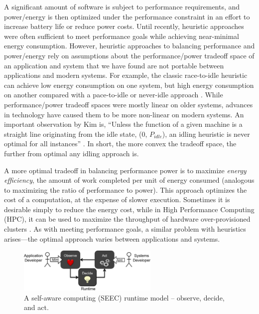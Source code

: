 A significant amount of software is subject to performance requirements, and power/energy is then optimized under the performance constraint in an effort to increase battery life or reduce power costs.
Until recently, heuristic approaches were often sufficient to meet performance goals while achieving near-minimal energy consumption.
However, heuristic approaches to balancing performance and power/energy rely on assumptions about the performance/power tradeoff space of an application and system that we have found are not portable between applications and modern systems.
For example, the classic race-to-idle heuristic can achieve low energy consumption on one system, but high energy consumption on another compared with a pace-to-idle or never-idle approach \cite{Imes2014}.
While performance/power tradeoff spaces were mostly linear on older systems, advances in technology have caused them to be more non-linear on modern systems.
An important observation by Kim \etal is, ``Unless the function of a given machine is a straight line originating from the idle state, (0, $P_{idle}$), an idling heuristic is never optimal for all instances'' \cite{kim-cpsna2015}.
In short, the more convex the tradeoff space, the further from optimal any idling approach is.

A more optimal tradeoff in balancing performance power is to maximize \emph{energy efficiency}, \ie the amount of work completed per unit of energy consumed (analogous to maximizing the ratio of performance to power).
This approach optimizes the cost of a computation, at the expense of slower execution.
Sometimes it is desirable simply to reduce the energy cost, while in High Performance Computing (HPC), it can be used to maximize the throughput of hardware over-provisioned clusters \cite{PatkiRMAP}.
As with meeting performance goals, a similar problem with heuristics arises---the optimal approach varies between applications and systems.


\begin{figure}[t]
  \begin{centering}
  \includegraphics[width=0.6\textwidth]{figs/SEEC.png}
  \caption{A self-aware computing (SEEC) runtime model -- observe, decide, and act.}
  \label{fig:seec}
  \end{centering}
\end{figure}

